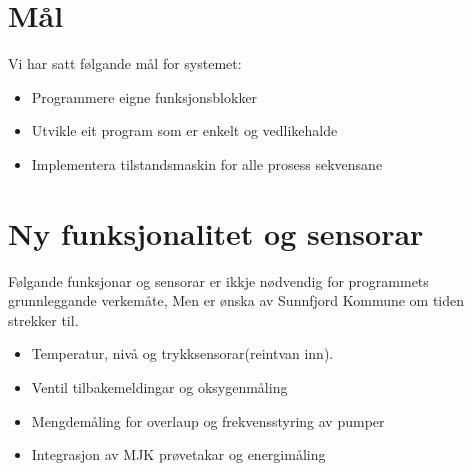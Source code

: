 \newpage
\section{Mål}
Vi har satt følgande mål for systemet:

\begin{itemize}
    \item Programmere eigne funksjonsblokker
    \item Utvikle eit program som er enkelt og vedlikehalde
    \item Implementera tilstandsmaskin for alle prosess sekvensane
\end{itemize}

\section{Ny funksjonalitet og sensorar}
Følgande funksjonar og sensorar er ikkje nødvendig for programmets grunnleggande verkemåte, Men 
er ønska av \gls{Sunnfjord Kommune} om tiden strekker til.  
\begin{itemize}
    \item Temperatur, nivå og trykksensorar(reintvan inn).
    \item Ventil tilbakemeldingar og oksygenmåling
    \item Mengdemåling for overlaup og frekvensstyring av pumper
    \item Integrasjon av \gls{MJK} prøvetakar og energimåling
\end{itemize}


